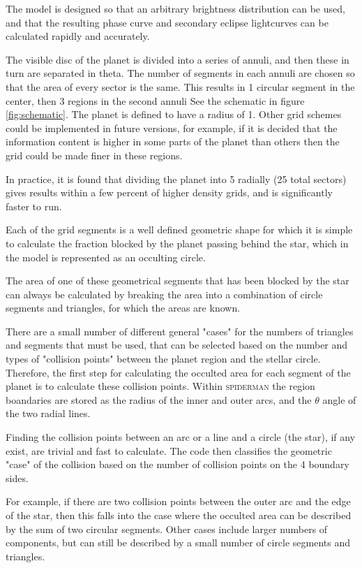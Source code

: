 \documentclass[a4paper,fleqn,usenatbib]{mnras}
\begin{document}
The model is designed so that an arbitrary brightness distribution can be used, and that the resulting phase curve and secondary eclipse lightcurves can be calculated rapidly and accurately. 

The visible disc of the planet is divided into a series of annuli, and then these in turn are separated in theta. The number of segments in each annuli are chosen so that the area of every sector is the same. This results in 1 circular segment in the center, then 3 regions in the second annuli See the schematic in figure \ref{fig:schematic}. The planet is defined to have a radius of 1. Other grid schemes could be implemented in future versions, for example, if it is decided that the information content is higher in some parts of the planet than others then the grid could be made finer in these regions.


In practice, it is found that dividing the planet into 5 radially (25 total sectors) gives results within a few percent of higher density grids, and is significantly faster to run.

Each of the grid segments is a well defined geometric shape for which it is simple to calculate the fraction blocked by the planet passing behind the star, which in the model is represented as an occulting circle.

The area of one of these geometrical segments that has been blocked by the star can always be calculated by breaking the area into a combination of circle segments and triangles, for which the areas are known.

There are a small number of different general "cases" for the numbers of triangles and segments that must be used, that can be selected based on the number and types of "collision points" between the planet region and the stellar circle. Therefore, the first step for calculating the occulted area for each segment of the planet is to calculate these collision points. Within \textsc{spiderman} the region boandaries are stored as the radius of the inner and outer arcs, and the $\theta$ angle of the two radial lines.

Finding the collision points between an arc or a line and a circle (the star), if any exist, are trivial and fast to calculate. The code then classifies the geometric "case" of the collision based on the number of collision points on the 4 boundary sides.

For example, if there are two collision points between the outer arc and the edge of the star, then this falls into the case where the occulted area can be described by the sum of two circular segments. Other cases include larger numbers of components, but can still be described by a small number of circle segments and triangles.
\end{document}

